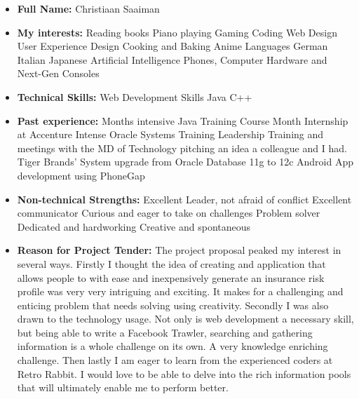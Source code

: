 \documentclass{article}
\begin{document}
    \begin{itemize}
    \item \textbf{Full Name:} Christiaan Saaiman
    \item \textbf{My interests:}
    	\subitem Reading books
        \subitem Piano playing
        \subitem Gaming
        \subitem Coding
        \subitem Web Design
        \subitem User Experience Design
        \subitem Cooking and Baking
		\subitem Anime
        \subitem Languages
        	\subsubitem German
            \subsubitem Italian
            \subsubitem Japanese
        \subitem Artificial Intelligence
        \subitem Phones, Computer Hardware and Next-Gen Consoles

	\item \textbf{Technical Skills:}
    	\subitem Web Development Skills
        \subitem Java
        \subitem C++
        
	\item \textbf{Past experience:}
    	 Months intensive Java Training Course
         Month Internship at Accenture
        	\subsubitem Intense Oracle Systems Training
            \subsubitem Leadership Training and meetings with the MD of Technology
            \subsubitem pitching an idea a colleague and I had.
            \subsubitem Tiger Brands' System upgrade from Oracle Database 11g to 12c
        \subitem Android App development using PhoneGap

    \item \textbf{Non-technical Strengths:}
    	\subitem Excellent Leader, not  afraid of conflict
        \subitem Excellent communicator
        \subitem Curious and eager to take on challenges
        \subitem Problem solver
        \subitem Dedicated and hardworking
        \subitem Creative and spontaneous
        
   \item \textbf{Reason for Project Tender:} \newline
   The project proposal peaked my interest in several ways. Firstly I thought the idea of creating and application that allows people to with ease and inexpensively generate an insurance risk profile was very very intriguing and exciting. It makes for a challenging and enticing problem that needs solving using creativity. Secondly I was also drawn to the technology usage. Not only is web development a necessary skill, but being able to write a Facebook Trawler, searching and gathering information is a whole challenge on its own. A very knowledge enriching challenge. Then lastly I am eager to learn from the experienced coders at Retro Rabbit. I would love to be able to delve into the rich information pools that will ultimately enable me to perform better.
	\end{itemize}
		
\end{document}
